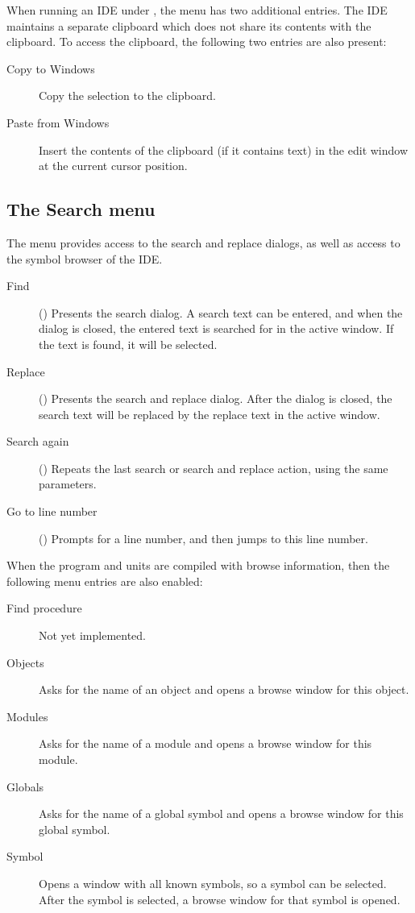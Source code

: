 When running an IDE under \windows, the  menu has two
additional entries. The IDE maintains a separate clipboard which does
not share its contents with the \windows clipboard. To access the \windows
clipboard, the following two entries are also present:
\begin{description}
\item[Copy to Windows] Copy the selection to the \windows clipboard.
\item[Paste from Windows] Insert the contents of the \windows clipboard 
(if it contains text) in the edit window at the current cursor position.
\end{description}

%
%
\subsection{The Search menu}
\label{se:menusearch}
The  menu provides access to the search and replace dialogs, as well as
access to the symbol browser of the IDE.
\begin{description}
\item[Find] () Presents the search dialog. A search text
can be entered, and when the dialog is closed, the entered text is searched
for in the active window. If the text is found, it will be selected.
\item[Replace] () Presents the search and replace dialog.
After the dialog is closed, the search text will be replaced by the replace
text in the active window.
\item[Search again] () Repeats the last search or search and replace action,
 using  the same parameters.
\item[Go to line number] () Prompts for a line number, and
then jumps to this line number.
\end{description}
When the program and units are compiled with browse information, then
the following menu entries are also enabled:
\begin{description}
\item[Find procedure]
Not yet implemented.
\item[Objects]
Asks for the name of an object and opens a browse window for this object.
\item[Modules]
Asks for the name of a module and opens a browse window for this module.
\item[Globals]
Asks for the name of a global symbol and opens a browse window for this
global symbol.
\item[Symbol]
Opens a window with all known symbols, so a symbol can be selected. After
the symbol is selected, a browse window for that symbol is opened.
\end{description}
%
%

